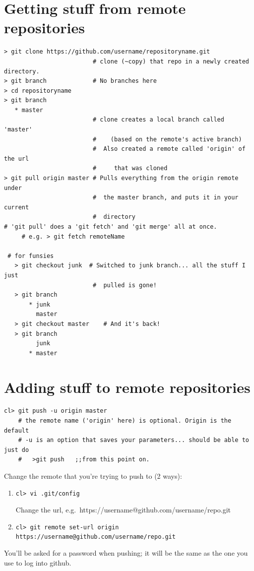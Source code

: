 \documentclass{article}
\begin{document}
\section{Getting stuff from remote repositories}
\begin{verbatim}
> git clone https://github.com/username/repositoryname.git
                         # clone (~copy) that repo in a newly created directory.
> git branch             # No branches here
> cd repositoryname
> git branch
   * master
                         # clone creates a local branch called 'master'
                         #    (based on the remote's active branch)
                         #  Also created a remote called 'origin' of the url
                         #     that was cloned
> git pull origin master # Pulls everything from the origin remote under
                         #  the master branch, and puts it in your current
                         #  directory
# 'git pull' does a 'git fetch' and 'git merge' all at once.
     # e.g. > git fetch remoteName

 # for funsies
   > git checkout junk  # Switched to junk branch... all the stuff I just
                         #  pulled is gone!
   > git branch
       * junk
         master
   > git checkout master    # And it's back!
   > git branch
         junk
       * master
\end{verbatim}

\section{Adding stuff to remote repositories}
\begin{verbatim}
cl> git push -u origin master
    # the remote name ('origin' here) is optional. Origin is the default
    # -u is an option that saves your parameters... should be able to just do
    #   >git push   ;;from this point on.
\end{verbatim}

Change the remote that you're trying to push to (2 ways):
\begin{enumerate}
    \item \begin{verbatim}cl> vi .git/config \end{verbatim}
      Change the url, e.g.\ https://username@github.com/username/repo.git
    \item \texttt{cl> git remote set-url origin https://username@github.com/username/repo.git}
\end{enumerate}

You'll be asked for a password when pushing; it will be the same as
the one you use to log into github.
\end{document}
